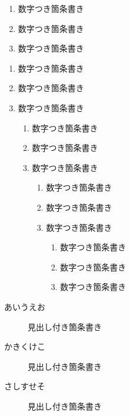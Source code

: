 \documentclass[titlepage, a4paper, 11pt, dvipdfmx]{jsarticle}
\begin{document}
\begin{enumerate}
\item 数字つき箇条書き
\item 数字つき箇条書き
\item 数字つき箇条書き
\end{enumerate}

\begin{enumerate}
\item 数字つき箇条書き
\item 数字つき箇条書き
\item 数字つき箇条書き

\begin{enumerate}
\item 数字つき箇条書き
\item 数字つき箇条書き
\item 数字つき箇条書き

\begin{enumerate}
\item 数字つき箇条書き
\item 数字つき箇条書き
\item 数字つき箇条書き

\begin{enumerate}
\item 数字つき箇条書き
\item 数字つき箇条書き
\item 数字つき箇条書き
\end{enumerate}

\end{enumerate}

\end{enumerate}

\end{enumerate}

\begin{description}
\item[あいうえお] 見出し付き箇条書き
\item[かきくけこ] 見出し付き箇条書き
\item[さしすせそ] 見出し付き箇条書き
\end{description}
\end{document}
